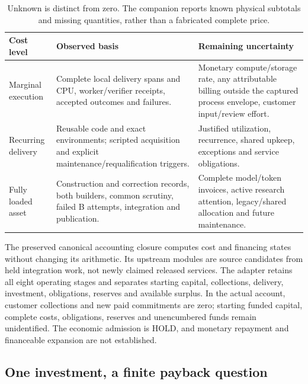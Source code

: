 \documentclass[11pt,a4paper]{article}
\begin{document}
\begin{table}[htbp]
\centering\small
\begin{tabularx}{\textwidth}{@{}p{}YY@{}}
\toprule
Cost level & Observed basis & Remaining uncertainty \\
\midrule
Marginal execution & Complete local delivery spans and CPU, worker/verifier receipts, accepted outcomes and failures. & Monetary compute/storage rate, any attributable billing outside the captured process envelope, customer input/review effort. \\
Recurring delivery & Reusable code and exact environments; scripted acquisition and explicit maintenance/requalification triggers. & Justified utilization, recurrence, shared upkeep, exceptions and service obligations. \\
Fully loaded asset & Construction and correction records, both builders, common scrutiny, failed B attempts, integration and publication. & Complete model/token invoices, active research attention, legacy/shared allocation and future maintenance. \\
\bottomrule
\end{tabularx}
\caption{Unknown is distinct from zero. The companion reports known physical subtotals and missing quantities, rather than a fabricated complete price.}
\end{table}

The preserved canonical accounting closure computes cost and financing states without changing its arithmetic. Its upstream modules are source candidates from held integration work, not newly claimed released services. The adapter retains all eight operating stages and separates starting capital, collections, delivery, investment, obligations, reserves and available surplus. In the actual account, customer collections and new paid commitments are zero; starting funded capital, complete costs, obligations, reserves and unencumbered funds remain unidentified. The economic admission is HOLD, and monetary repayment and financeable expansion are not established.\cite{canonical,economics}

\subsection{One investment, a finite payback question}
\end{document}

